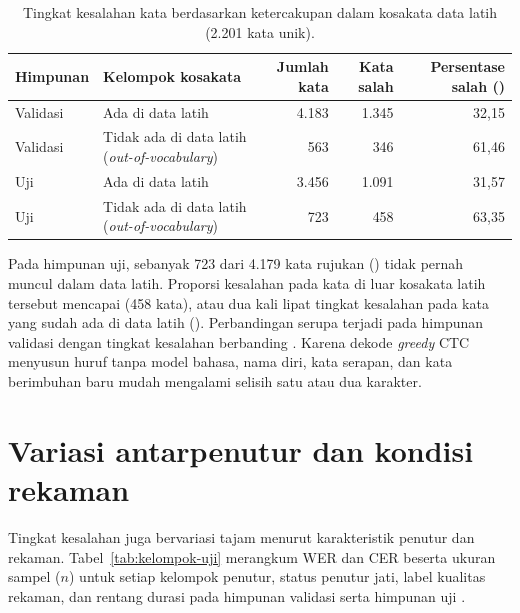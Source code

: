 \begin{table}[!htbp]
  \centering\small
  \caption{Tingkat kesalahan kata berdasarkan ketercakupan dalam kosakata data latih (2.201 kata unik).}
  \label{tab:kata-jarang}
  \begin{tabular}{@{}llrrr@{}}
    \toprule
    Himpunan & Kelompok kosakata & Jumlah kata & Kata salah & Persentase salah (\pct{}) \\
    \midrule
    Validasi & Ada di data latih & 4.183 & 1.345 & 32,15 \\
    Validasi & Tidak ada di data latih (\textit{out-of-vocabulary}) & 563 & 346 & 61,46 \\
    \midrule
    Uji & Ada di data latih & 3.456 & 1.091 & 31,57 \\
    Uji & Tidak ada di data latih (\textit{out-of-vocabulary}) & 723 & 458 & 63,35 \\
    \bottomrule
  \end{tabular}
\end{table}

Pada himpunan uji, sebanyak 723 dari 4.179 kata rujukan () tidak pernah muncul dalam data latih. Proporsi kesalahan pada kata di luar kosakata latih tersebut mencapai  (458 kata), atau dua kali lipat tingkat kesalahan pada kata yang sudah ada di data latih (). Perbandingan serupa terjadi pada himpunan validasi dengan tingkat kesalahan  berbanding . Karena dekode \textit{greedy} CTC menyusun huruf tanpa model bahasa, nama diri, kata serapan, dan kata berimbuhan baru mudah mengalami selisih satu atau dua karakter.

\section{Variasi antarpenutur dan kondisi rekaman}

Tingkat kesalahan juga bervariasi tajam menurut karakteristik penutur dan rekaman. Tabel~\ref{tab:kelompok-uji} merangkum WER dan CER beserta ukuran sampel (\(n\)) untuk setiap kelompok penutur, status penutur jati, label kualitas rekaman, dan rentang durasi pada himpunan validasi serta himpunan uji \cite{repoasr}.

